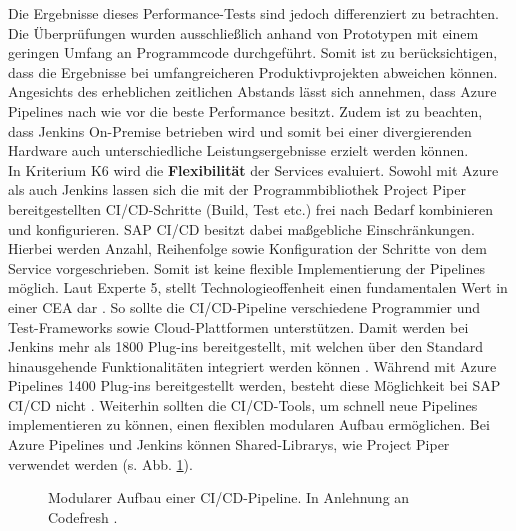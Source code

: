  Die Ergebnisse dieses Performance-Tests sind jedoch differenziert zu betrachten. Die Überprüfungen wurden ausschließlich anhand von Prototypen mit einem geringen Umfang an Programmcode durchgeführt. Somit ist zu berücksichtigen, dass die Ergebnisse bei umfangreicheren Produktivprojekten abweichen können. Angesichts des erheblichen zeitlichen Abstands lässt sich annehmen, dass Azure Pipelines nach wie vor die beste Performance besitzt. Zudem ist zu beachten, dass Jenkins On-Premise betrieben wird und somit bei einer divergierenden Hardware auch unterschiedliche Leistungsergebnisse erzielt werden können.\\ In Kriterium K6 wird die \textbf{Flexibilität} der Services evaluiert. Sowohl mit Azure als auch Jenkins lassen sich die mit der Programmbibliothek Project Piper bereitgestellten CI/CD-Schritte (Build, Test etc.) frei nach Bedarf kombinieren und konfigurieren. SAP CI/CD besitzt dabei maßgebliche Einschränkungen. Hierbei werden Anzahl, Reihenfolge sowie Konfiguration der Schritte von dem Service vorgeschrieben. Somit ist keine flexible Implementierung der Pipelines möglich. Laut Experte 5, stellt Technologieoffenheit einen fundamentalen Wert in einer CEA dar \cite[Z. 13 ff.]{SoftwareArchitektSAPDTSIntegration.}. So sollte die CI/CD-Pipeline verschiedene Programmier und Test-Frameworks sowie Cloud-Plattformen unterstützen. Damit werden bei Jenkins mehr als 1800 Plug-ins bereitgestellt, mit welchen über den Standard hinausgehende Funktionalitäten integriert werden können \cite{.20230410c}. Während mit Azure Pipelines 1400 Plug-ins bereitgestellt werden, besteht diese Möglichkeit bei SAP CI/CD nicht \cite{.20230410d}. Weiterhin sollten die CI/CD-Tools, um schnell neue Pipelines implementieren zu können, einen flexiblen modularen Aufbau ermöglichen. Bei Azure Pipelines und Jenkins können Shared-Librarys, wie Project Piper verwendet werden (s. Abb. \ref{fig:Modular}).
 \begin{center}
	\begin{figure}[H]
		\centering
		\caption[Modularer Aufbau einer CI/CD-Pipeline]{Modularer Aufbau einer CI/CD-Pipeline. In Anlehnung an Codefresh \cite{.20230402}.}
		\label{fig:Modular}
	\end{figure}
\end{center}
\vspace*{-15mm}
